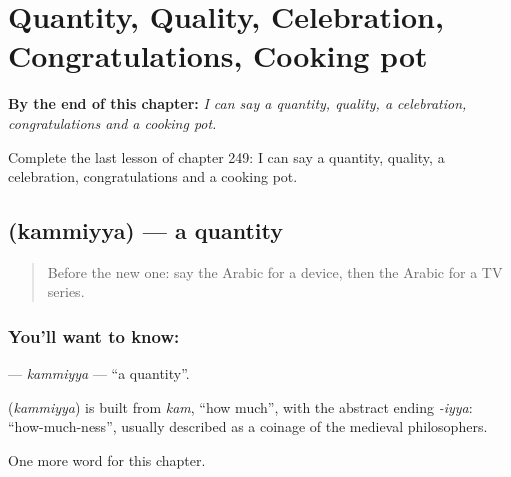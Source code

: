 
\chapter{Quantity, Quality, Celebration, Congratulations, Cooking pot}
\label{ch:ar-quantity-quality-celebration-congratulations-cooking-pot}

\begin{chapteropening}
\textbf{By the end of this chapter:} \emph{I can say a quantity, quality, a celebration, congratulations and a cooking pot.}

Complete the last lesson of chapter 249: I can say a quantity, quality, a celebration, congratulations and a cooking pot.
\end{chapteropening}

\section[\texorpdfstring{\ar{كمية} (kammiyya)}{كمية (kammiyya)}]{ (kammiyya) — a quantity}

\label{lesson:AR-C249-kammiyya}



\begin{quote}
Before the new one: say the Arabic for a device, then the Arabic for a TV series.
\end{quote}

\subsection*{You'll want to know: }
\textbf{} — \emph{kammiyya} — \textquotedblleft{}a quantity\textquotedblright{}.

\begin{cousinweb}
\textbf{} (\emph{kammiyya}) is built from \emph{kam}, \textquotedblleft{}how much\textquotedblright{}, with the abstract ending \emph{-iyya}: \textquotedblleft{}how-much-ness\textquotedblright{}, usually described as a coinage of the medieval philosophers.
\end{cousinweb}

\begin{grammarlens}[title={What you've built}]
One more word for this chapter.
\end{grammarlens}

